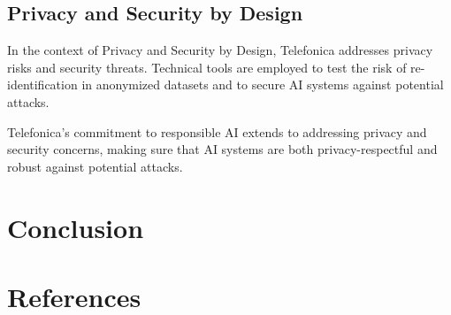 \documentclass{article}
\begin{document}
\subsection{Privacy and Security by Design}
In the context of Privacy and Security by Design, Telefonica addresses privacy risks and security threats. Technical tools are employed to test the risk of re-identification in anonymized datasets and to secure AI systems against potential attacks.

Telefonica's commitment to responsible AI extends to addressing privacy and security concerns, making sure that AI systems are both privacy-respectful and robust against potential attacks.



\newpage
\section{Conclusion}

\newpage
\section{References}
\end{document}

